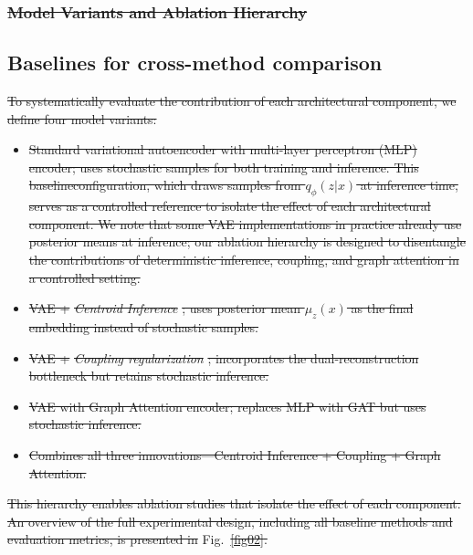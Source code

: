 \documentclass[referee, pdflatex, sn-vancouver-num]{sn-jnl}
\providecommand{\DIFaddtex}[1]{{\protect\color{blue}\uwave{#1}}} %
\providecommand{\DIFdeltex}[1]{{\protect\color{red}\sout{#1}}}                      %
\providecommand{\DIFaddbegin}{} %
\providecommand{\DIFaddend}{} %
\providecommand{\DIFdelbegin}{} %
\providecommand{\DIFdelend}{} %
\providecommand{\DIFadd}[1]{\texorpdfstring{\DIFaddtex{#1}}{#1}} %
\providecommand{\DIFdel}[1]{\texorpdfstring{\DIFdeltex{#1}}{}} %
\newcommand{\DIFscaledelfig}{0.5}
\newlength{\DIFdelgraphicswidth} %
\newlength{\DIFdelgraphicsheight} %
\newcommand{\DIFaddincludegraphics}[2][]{{\color{blue}\fbox{\DIFOincludegraphics[#1]{#2}}}} %
\newcommand{\DIFdelincludegraphics}[2][]{%
\sbox{\DIFdelgraphicsbox}{\DIFOincludegraphics[#1]{#2}}%
\settoboxwidth{\DIFdelgraphicswidth}{\DIFdelgraphicsbox} %
\settoboxtotalheight{\DIFdelgraphicsheight}{\DIFdelgraphicsbox} %
\scalebox{\DIFscaledelfig}{%
\parbox[b]{\DIFdelgraphicswidth}{\usebox{\DIFdelgraphicsbox}\\[-\baselineskip] \rule{\DIFdelgraphicswidth}{0em}}\llap{\resizebox{\DIFdelgraphicswidth}{\DIFdelgraphicsheight}{%
\setlength{\unitlength}{\DIFdelgraphicswidth}%
\begin{picture}(1,1)%
\thicklines\linethickness{2pt} %
{\color[rgb]{1,0,0}\put(0,0){\framebox(1,1){}}}%
{\color[rgb]{1,0,0}\put(0,0){\line( 1,1){1}}}%
{\color[rgb]{1,0,0}\put(0,1){\line(1,-1){1}}}%
\end{picture}%
}\hspace*{3pt}}} %
} %
\DeclareRobustCommand{\DIFaddbegin}{\DIFOaddbegin \let\includegraphics\DIFaddincludegraphics} %
\DeclareRobustCommand{\DIFaddend}{\DIFOaddend \let\includegraphics\DIFOincludegraphics} %
\DeclareRobustCommand{\DIFdelbegin}{\DIFOdelbegin \let\includegraphics\DIFdelincludegraphics} %
\DeclareRobustCommand{\DIFdelend}{\DIFOaddend \let\includegraphics\DIFOincludegraphics} %
\begin{document}
\DIFdelbegin \subsubsection{\DIFdel{Model Variants and Ablation Hierarchy}}
\addtocounter{subsubsection}{-1}%
\DIFdelend \DIFaddbegin \subsection{Baselines for cross-method comparison}\label{sec:comparators}
\DIFaddend

\DIFdelbegin \DIFdel{To systematically evaluate the contribution of each architectural component, we define four model variants:
}%
\begin{itemize}%
\item%
\DIFdel{Standard variational autoencoder with multi-layer perceptron (MLP) encoder; uses stochastic samples for both training and inference. This baselineconfiguration, which draws samples from $q_\phi(z|x)$ at inference time, serves as a controlled reference to isolate the effect of each architectural component. We note that some VAE implementations in practice already use posterior means at inference; our ablation hierarchy is designed to disentangle the contributions of deterministic inference, coupling, and graph attention in a controlled setting.
    }%
\item%
\DIFdel{VAE + }\textit{\DIFdel{Centroid Inference}}%
\DIFdel{; uses posterior mean $\mu_z(x)$ as the final embedding instead of stochastic samples.
    }%
\item%
\DIFdel{VAE + }\textit{\DIFdel{Coupling regularization}}%
\DIFdel{; incorporates the dual-reconstruction bottleneck but retains stochastic inference.
    }%
\item%
\DIFdel{VAE with Graph Attention encoder; replaces MLP with GAT but uses stochastic inference.
    }%
\item%
\DIFdel{Combines all three innovations---Centroid Inference + Coupling + Graph Attention.
}
\end{itemize}%
\DIFdel{This hierarchy enables ablation studies that isolate the effect of each component.
An overview of the full experimental design, including all baseline methods and evaluation metrics, is presented in }\DIFdelend \DIFaddbegin \DIFadd{On scRNA-seq (}\DIFaddend Fig.~\DIFdelbegin \DIFdel{\ref{fig02}.
}%
\end{document}
